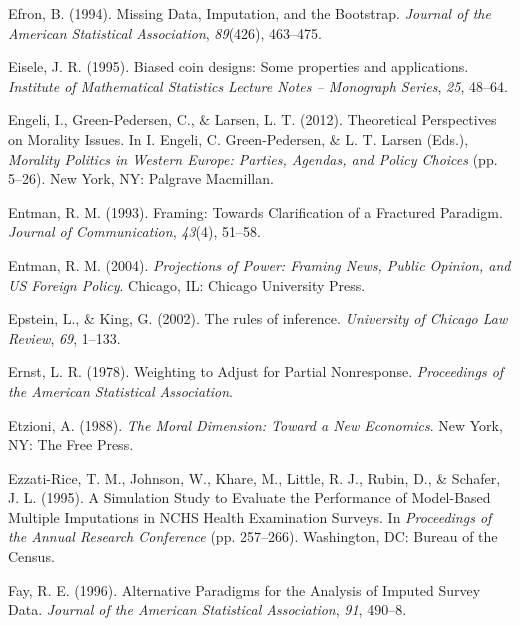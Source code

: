 \documentclass[12pt,econ]{sources/authesis}
\begin{document}
\leavevmode\hypertarget{ref-efron_1994_missing}{}%
Efron, B. (1994). Missing Data, Imputation, and the Bootstrap. \emph{Journal of the American Statistical Association}, \emph{89}(426), 463--475.

\leavevmode\hypertarget{ref-eisele_1995_biased}{}%
Eisele, J. R. (1995). Biased coin designs: Some properties and applications. \emph{Institute of Mathematical Statistics Lecture Notes -- Monograph Series}, \emph{25}, 48--64.

\leavevmode\hypertarget{ref-engeli_2012_theoretical}{}%
Engeli, I., Green-Pedersen, C., \& Larsen, L. T. (2012). Theoretical Perspectives on Morality Issues. In I. Engeli, C. Green-Pedersen, \& L. T. Larsen (Eds.), \emph{Morality Politics in Western Europe: Parties, Agendas, and Policy Choices} (pp. 5--26). New York, NY: Palgrave Macmillan.

\leavevmode\hypertarget{ref-entman_framing_1993}{}%
Entman, R. M. (1993). Framing: Towards Clarification of a Fractured Paradigm. \emph{Journal of Communication}, \emph{43}(4), 51--58.

\leavevmode\hypertarget{ref-entman_projections_2004}{}%
Entman, R. M. (2004). \emph{Projections of Power: Framing News, Public Opinion, and US Foreign Policy}. Chicago, IL: Chicago University Press.

\leavevmode\hypertarget{ref-epstein_2002_rules}{}%
Epstein, L., \& King, G. (2002). The rules of inference. \emph{University of Chicago Law Review}, \emph{69}, 1--133.

\leavevmode\hypertarget{ref-ernst_1978_weighting}{}%
Ernst, L. R. (1978). Weighting to Adjust for Partial Nonresponse. \emph{Proceedings of the American Statistical Association}.

\leavevmode\hypertarget{ref-etzioni_moral_1988}{}%
Etzioni, A. (1988). \emph{The Moral Dimension: Toward a New Economics}. New York, NY: The Free Press.

\leavevmode\hypertarget{ref-ezzati-rice_1995_simulation}{}%
Ezzati-Rice, T. M., Johnson, W., Khare, M., Little, R. J., Rubin, D., \& Schafer, J. L. (1995). A Simulation Study to Evaluate the Performance of Model-Based Multiple Imputations in NCHS Health Examination Surveys. In \emph{Proceedings of the Annual Research Conference} (pp. 257--266). Washington, DC: Bureau of the Census.

\leavevmode\hypertarget{ref-fay_1996_alternative}{}%
Fay, R. E. (1996). Alternative Paradigms for the Analysis of Imputed Survey Data. \emph{Journal of the American Statistical Association}, \emph{91}, 490--8.
\end{document}
